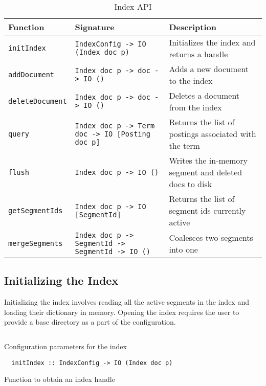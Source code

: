 \begin{table}[ht]
  \caption{Index API}
  \centering
  \begin{tabular}{|p{3cm}|p{6cm}|p{6cm}|}
    \toprule
    Function & Signature & Description \\
    \midrule
    \texttt{initIndex} &  \texttt{IndexConfig -> IO (Index doc p)} & Initializes the index and returns a handle \\
    \midrule
    \texttt{addDocument} &  \texttt{Index doc p -> doc -> IO ()}   & Adds a new document to the index \\
\midrule
    \texttt{deleteDocument} &  \texttt{Index doc p -> doc -> IO ()}   & Deletes a document from the index \\
    \midrule
    \texttt{query} &  \texttt{Index doc p -> Term doc -> IO [Posting doc p]}   & Returns the list of postings associated with the term \\
    \midrule
    \texttt{flush} &  \texttt{Index doc p -> IO ()}   & Writes the in-memory segment and deleted docs to disk \\
    \midrule
    \texttt{getSegmentIds} &  \texttt{Index doc p -> IO [SegmentId]}   & Returns the list of segment ids currently active \\
    \midrule
    \texttt{mergeSegments} &  \texttt{Index doc p -> SegmentId -> SegmentId -> IO ()} & Coalesces two segments into one\\
    \bottomrule
\end{tabular}
\end{table}


\subsection{Initializing the Index}
Initializing the index involves reading all the active segments in the index and loading their dictionary in memory.
Opening the index requires the user to provide a base directory as a part of the configuration.
\begin{listing}
\inputminted{haskell}{hs/hconfig.hs}
\caption{Configuration parameters for the index}
\end{listing}

\begin{listing}
\begin{verbatim}
  initIndex :: IndexConfig -> IO (Index doc p)
\end{verbatim}
\caption{Function to obtain an index handle}
\end{listing}

